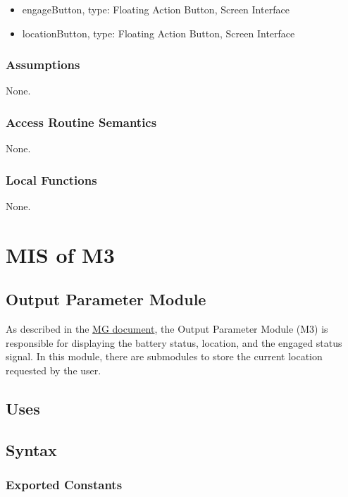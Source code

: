 \begin{itemize}
\item engageButton, type: Floating Action Button, Screen Interface
\item locationButton, type: Floating Action Button, Screen Interface
\end{itemize}


\subsubsection{Assumptions}
None.

\subsubsection{Access Routine Semantics}

None.

\subsubsection{Local Functions}

None.


\section{MIS of M3} \label{OutputParameters} 

\subsection{Output Parameter Module}

As described in the \href{https://github.com/NevoAbigail/Capstone/blob/main/docs/Design/SoftArchitecture/MG.pdf}{MG document}, the Output Parameter Module (M3) is responsible for displaying the battery status, location, and the engaged status signal. In this module, there are submodules to store the current location requested by the user. 

\subsection{Uses}


\subsection{Syntax}

\subsubsection{Exported Constants}

